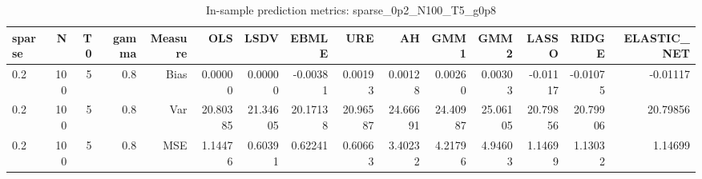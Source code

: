 \begin{table}[!htbp]\centering
\caption{In-sample prediction metrics: sparse_0p2_N100_T5_g0p8}
\label{tab:table2_sparse_0p2_N100_T5_g0p8}
\begin{tabular}{lrrrrrrrrrrrrrr}
\hline
sparse & N & T0 & gamma & Measure & OLS & LSDV & EBMLE & URE & AH & GMM1 & GMM2 & LASSO & RIDGE & ELASTIC_NET \\
\hline
0.2 & 100 & 5 & 0.8 & Bias & 0.00000 & 0.00000 & -0.00381 & 0.00193 & 0.00128 & 0.00260 & 0.00303 & -0.01117 & -0.01075 & -0.01117 \\
0.2 & 100 & 5 & 0.8 & Var & 20.80385 & 21.34605 & 20.17138 & 20.96587 & 24.66691 & 24.40987 & 25.06105 & 20.79856 & 20.79906 & 20.79856 \\
0.2 & 100 & 5 & 0.8 & MSE & 1.14476 & 0.60391 & 0.62241 & 0.60663 & 3.40232 & 4.21796 & 4.94603 & 1.14699 & 1.13032 & 1.14699 \\
\hline
\end{tabular}
\end{table}


